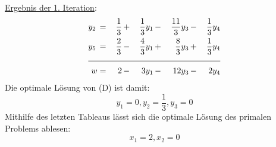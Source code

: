\documentclass[10pt,a4paper,oneside,ngerman,numbers=noenddot]{scrartcl}
\begin{document}
		\underline{Ergebnis der 1. Iteration}:
		\begin{alignat*}{5}
			y_{2} \,&=&\, \frac{1}{3} \,&+&\, \frac{1}{3}y_{1} \,&-&\, \frac{11}{3}y_{3} \,&-&\, \frac{1}{3}y_{4} \\
			y_{5} \,&=&\, \frac{2}{3} \,&-&\, \frac{4}{3}y_{1} \,&+&\, \frac{8}{3}y_{3} \,&+&\, \frac{1}{3}y_{4} \\ \cline{1 - 9}
			w &=& 2 \,&-&\, 3y_{1} \,&-&\, 12y_{3} \,&-&\, 2y_{4}
		\end{alignat*}
		Die optimale Lösung von (D) ist damit:
		\[
			y_{1} = 0, y_{2} = \frac{1}{3}, y_{3} = 0
		\]
		Mithilfe des letzten Tableaus lässt sich die optimale Lösung des primalen Problems ablesen:
		\[
			x_{1} = 2, x_{2} = 0
		\]
\end{document}
